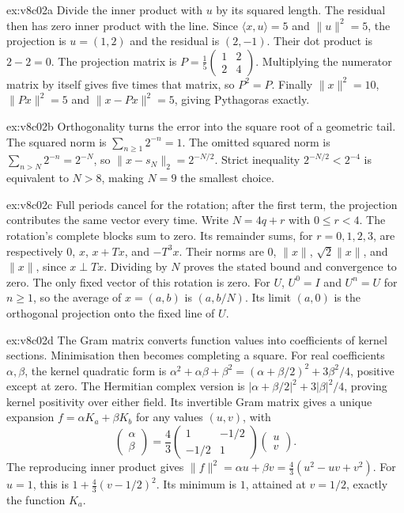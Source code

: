 \begin{solution}{ex:v8c02a}
\idea Divide the inner product with $u$ by its squared length. The residual then has zero inner product with the line.
\writeup Since $\langle x,u\rangle=5$ and $\|u\|^2=5$, the projection is $u=(1,2)$ and the residual is $(2,-1)$. Their dot product is $2-2=0$. The projection matrix is $P=\frac15\begin{pmatrix}1&2\\2&4\end{pmatrix}$. Multiplying the numerator matrix by itself gives five times that matrix, so $P^2=P$. Finally $\|x\|^2=10$, $\|Px\|^2=5$ and $\|x-Px\|^2=5$, giving Pythagoras exactly.
\end{solution}
\begin{solution}{ex:v8c02b}
\idea Orthogonality turns the error into the square root of a geometric tail.
\writeup The squared norm is $\sum_{n\ge1}2^{-n}=1$. The omitted squared norm is $\sum_{n>N}2^{-n}=2^{-N}$, so $\|x-s_N\|_2=2^{-N/2}$. Strict inequality $2^{-N/2}<2^{-4}$ is equivalent to $N>8$, making $N=9$ the smallest choice.
\end{solution}
\begin{solution}{ex:v8c02c}
\idea Full periods cancel for the rotation; after the first term, the projection contributes the same vector every time.
\writeup Write $N=4q+r$ with $0\le r<4$. The rotation's complete blocks sum to zero. Its remainder sums, for $r=0,1,2,3$, are respectively $0$, $x$, $x+Tx$, and $-T^3x$. Their norms are $0$, $\|x\|$, $\sqrt2\|x\|$, and $\|x\|$, since $x\perp Tx$. Dividing by $N$ proves the stated bound and convergence to zero. The only fixed vector of this rotation is zero. For $U$, $U^0=I$ and $U^n=U$ for $n\ge1$, so the average of $x=(a,b)$ is $(a,b/N)$. Its limit $(a,0)$ is the orthogonal projection onto the fixed line of $U$.
\end{solution}
\begin{solution}{ex:v8c02d}
\idea The Gram matrix converts function values into coefficients of kernel sections. Minimisation then becomes completing a square.
\writeup For real coefficients $\alpha,\beta$, the kernel quadratic form is $\alpha^2+\alpha\beta+\beta^2=(\alpha+\beta/2)^2+3\beta^2/4$, positive except at zero. The Hermitian complex version is $|\alpha+\beta/2|^2+3|\beta|^2/4$, proving kernel positivity over either field. Its invertible Gram matrix gives a unique expansion $f=\alpha K_a+\beta K_b$ for any values $(u,v)$, with
\[\begin{pmatrix}\alpha\\\beta\end{pmatrix}=\frac43\begin{pmatrix}1&-1/2\\-1/2&1\end{pmatrix}\begin{pmatrix}u\\v\end{pmatrix}.\]
The reproducing inner product gives $\|f\|^2=\alpha u+\beta v=\frac43(u^2-uv+v^2)$. For $u=1$, this is $1+\frac43(v-1/2)^2$. Its minimum is $1$, attained at $v=1/2$, exactly the function $K_a$.
\end{solution}

